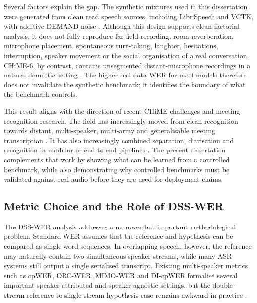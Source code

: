 Several factors explain the gap. The synthetic mixtures used in this dissertation were generated from clean read speech sources, including LibriSpeech and VCTK, with additive DEMAND noise \citep{librispeech, voxceleb, demand}. Although this design supports clean factorial analysis, it does not fully reproduce far-field recording, room reverberation, microphone placement, spontaneous turn-taking, laughter, hesitations, interruption, speaker movement or the social organisation of a real conversation. CHiME-6, by contrast, contains unsegmented distant-microphone recordings in a natural domestic setting \citep{watanabe2020chime6challengetacklingmultispeakerspeech}. The higher real-data WER for most models therefore does not invalidate the synthetic benchmark; it identifies the boundary of what the benchmark controls.

This result aligns with the direction of recent CHiME challenges and meeting recognition research. The field has increasingly moved from clean recognition towards distant, multi-speaker, multi-array and generalisable meeting transcription \citep{BARKER2017605, chime7, chime8_task1, cornell2024chime8dasrchallengegeneralizable}. It has also increasingly combined separation, diarisation and recognition in modular or end-to-end pipelines \citep{raj2020integrationspeechseparationdiarization, chen2020continuousspeechseparationconformer, vonneumann2024meetingrecognitioncontinuousspeech}. The present dissertation complements that work by showing what can be learned from a controlled benchmark, while also demonstrating why controlled benchmarks must be validated against real audio before they are used for deployment claims.

\subsection{Metric Choice and the Role of DSS-WER}
The DSS-WER analysis addresses a narrower but important methodological problem. Standard WER assumes that the reference and hypothesis can be compared as single word sequences. In overlapping speech, however, the reference may naturally contain two simultaneous speaker streams, while many ASR systems still output a single serialised transcript. Existing multi-speaker metrics such as cpWER, ORC-WER, MIMO-WER and DI-cpWER formalise several important speaker-attributed and speaker-agnostic settings, but the double-stream-reference to single-stream-hypothesis case remains awkward in practice \citep{galibert2013methodologies, von_Neumann_2023, vonneumann2024meetevaltoolkitcomputationword, von_Neumann_2025, Word_Error_Rate_Definitions}.

